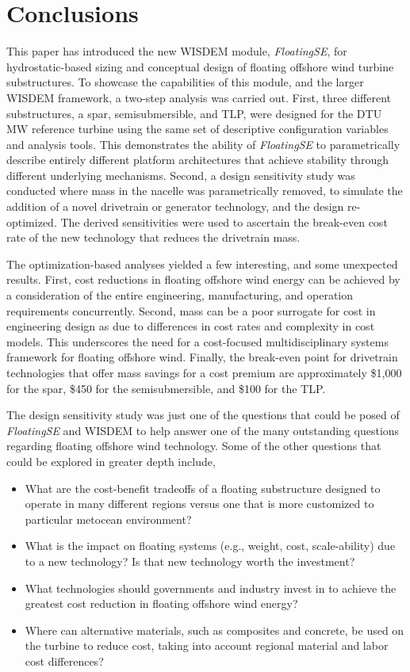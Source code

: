 \chapter{Conclusions}
\label{sec:conc}

This paper has introduced the new WISDEM module, \textit{FloatingSE},
for hydrostatic-based sizing and conceptual design of floating offshore
wind turbine substructures.  To showcase the capabilities of this
module, and the larger WISDEM framework, a two-step analysis was carried
out.  First, three different substructures, a spar, semisubmersible, and
TLP, were designed for the DTU \unit[10]{MW} reference turbine using the
same set of descriptive configuration variables and analysis tools.  This
demonstrates the ability of \textit{FloatingSE} to parametrically
describe entirely different platform architectures that achieve
stability through different underlying mechanisms.  Second, a design
sensitivity study was conducted where mass in the nacelle was
parametrically removed, to simulate the addition of a novel drivetrain
or generator technology, and the design re-optimized.  The derived
sensitivities were used to ascertain the break-even cost rate of the new
technology that reduces the drivetrain mass.

The optimization-based analyses yielded a few interesting, and some
unexpected results.  First, cost reductions in floating offshore wind
energy can be achieved by a consideration of the entire engineering,
manufacturing, and operation requirements concurrently.  Second, mass
can be a poor surrogate for cost in engineering design as due to
differences in cost rates and complexity in cost models.  This
underscores the need for a cost-focused multidisciplinary systems
framework for floating offshore wind.  Finally, the break-even point for
drivetrain technologies that offer mass savings for a cost premium are
approximately \$1,000 for the spar, \$450 for the semisubmersible, and
\$100 for the TLP.

The design sensitivity study was just one of the questions that could be
posed of \textit{FloatingSE} and WISDEM to help answer one of the many
outstanding questions regarding floating offshore wind technology.  Some
of the other questions that could be explored in greater depth include,
\begin{itemize}
\item What are the cost-benefit tradeoffs of a floating substructure
  designed to operate in many different regions versus one that is more
  customized to particular metocean environment?
\item What is the impact on floating systems (e.g., weight, cost,
  scale-ability) due to a new technology?  Is that new
  technology worth the investment?
\item What technologies should governments and industry invest in to
  achieve the greatest cost reduction in floating offshore wind energy?
\item Where can alternative materials, such as composites and concrete,
  be used on the turbine to reduce cost, taking into account regional
  material and labor cost differences?
\end{itemize}


